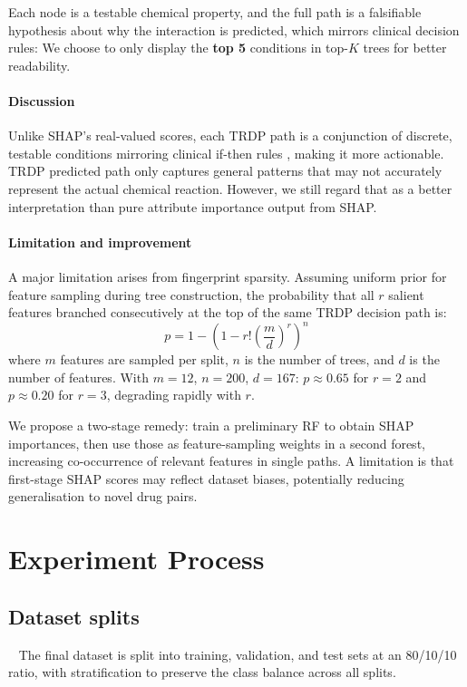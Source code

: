 \documentclass[letterpaper]{article} %
\begin{document}
Each node is a testable chemical property, and the full path is a falsifiable hypothesis about why the interaction is predicted, which mirrors clinical decision rules\cite{Rudin2019}:  We choose to only display the \textbf{top 5} conditions in top-$K$ trees for better readability.

\paragraph{Discussion}
Unlike SHAP's real-valued scores, each TRDP path is a conjunction of discrete, testable conditions mirroring clinical if-then rules \cite{Rudin2019}, making it more actionable. TRDP predicted path only captures general patterns that may not accurately represent the actual chemical reaction. However, we still regard that as a better interpretation than pure attribute importance output from SHAP.

\paragraph{Limitation and improvement}

A major limitation arises from fingerprint sparsity. Assuming uniform prior for feature sampling during tree construction, the probability that all $r$ salient features branched consecutively at the top of the same TRDP decision path is:
\begin{equation}
   p = 1 - \left(1 - r! \left(\frac{m}{d}\right)^{r}\right)^{n}
\end{equation}
where $m$ features are sampled per split, $n$ is the number of trees, and $d$ is the number of features. With $m=12$, $n=200$, $d=167$: $p\approx0.65$ for $r=2$ and $p\approx0.20$ for $r=3$, degrading rapidly with $r$.

We propose a two-stage remedy: train a preliminary RF to obtain SHAP importances, then use those as feature-sampling weights in a second forest, increasing co-occurrence of relevant features in single paths. A limitation is that first-stage SHAP scores may reflect dataset biases, potentially reducing generalisation to novel drug pairs.

\section{Experiment Process}

\subsection{Dataset splits}
\ 
\newline
The final dataset is split into training, validation, and test sets at an 80/10/10 ratio, with stratification to preserve the class balance across all splits.
\end{document}
